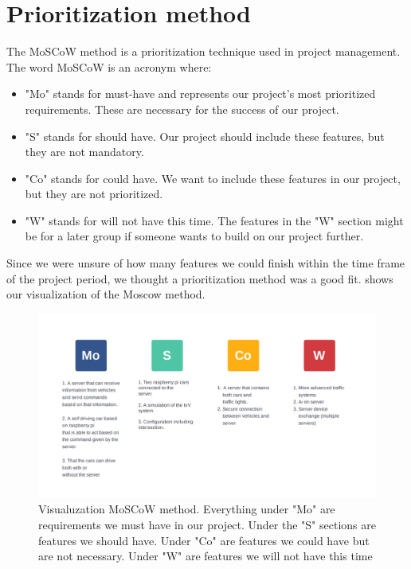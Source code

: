 \section{Prioritization method}\label{sec:moscow_method}
The MoSCoW method is a prioritization technique used in project management. The word MoSCoW is an acronym where:

\begin{itemize}
	\item "Mo" stands for must-have and represents our project's most prioritized requirements. These are necessary for the success of our project.
	\item "S" stands for should have. Our project should include these features, but they are not mandatory.
	\item "Co" stands for could have. We want to include these features in our project, but they are not prioritized.
	\item "W" stands for will not have this time. The features in the "W" section might be for a later group if someone wants to build on our project further.
\end{itemize}

Since we were unsure of how many features we could finish within the time frame of the project period, we thought a prioritization method was a good fit.  shows our visualization of the Moscow method.

\begin{figure}[h!]
	\centering
	\includegraphics[width=1\linewidth]{figures/MosCoW_method}
	\caption[MosCoW method]{Visualuzation MoSCoW method. Everything under "Mo" are requirements we must have in our project. Under the "S" sections are features we should have. Under "Co" are features we could have but are not necessary. Under "W" are features we will not have this time}
	\label{fig:moscowmethod}
\end{figure}


